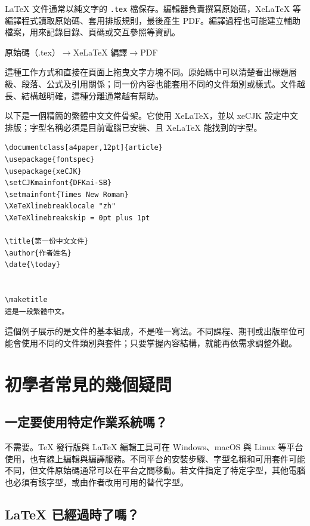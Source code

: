 LaTeX 文件通常以純文字的 \texttt{.tex} 檔保存。編輯器負責撰寫原始碼，XeLaTeX 等編譯程式讀取原始碼、套用排版規則，最後產生 PDF。編譯過程也可能建立輔助檔案，用來記錄目錄、頁碼或交互參照等資訊。

\begin{center}
原始碼（.tex）\quad $\longrightarrow$\quad XeLaTeX 編譯\quad $\longrightarrow$\quad PDF
\end{center}

這種工作方式和直接在頁面上拖曳文字方塊不同。原始碼中可以清楚看出標題層級、段落、公式及引用關係；同一份內容也能套用不同的文件類別或樣式。文件越長、結構越明確，這種分離通常越有幫助。

以下是一個精簡的繁體中文文件骨架。它使用 XeLaTeX，並以 xeCJK 設定中文排版；字型名稱必須是目前電腦已安裝、且 XeLaTeX 能找到的字型。

\begin{verbatim}
\documentclass[a4paper,12pt]{article}
\usepackage{fontspec}
\usepackage{xeCJK}
\setCJKmainfont{DFKai-SB}
\setmainfont{Times New Roman}
\XeTeXlinebreaklocale "zh"
\XeTeXlinebreakskip = 0pt plus 1pt

\title{第一份中文文件}
\author{作者姓名}
\date{\today}


\maketitle
這是一段繁體中文。

\end{verbatim}

這個例子展示的是文件的基本組成，不是唯一寫法。不同課程、期刊或出版單位可能會使用不同的文件類別與套件；只要掌握內容結構，就能再依需求調整外觀。

\section{初學者常見的幾個疑問}

\subsection{一定要使用特定作業系統嗎？}

不需要。TeX 發行版與 LaTeX 編輯工具可在 Windows、macOS 與 Linux 等平台使用，也有線上編輯與編譯服務。不同平台的安裝步驟、字型名稱和可用套件可能不同，但文件原始碼通常可以在平台之間移動。若文件指定了特定字型，其他電腦也必須有該字型，或由作者改用可用的替代字型。

\subsection{LaTeX 已經過時了嗎？}

